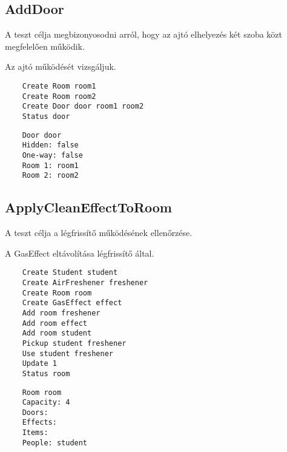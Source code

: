 \subsection{AddDoor}
\begin{test-case-description}
    A teszt célja megbizonyosodni arról, hogy az ajtó elhelyezés két szoba közt megfelelően működik.
\end{test-case-description}
\begin{test-case-function}
    Az ajtó működését vizsgáljuk.
\end{test-case-function}
\begin{test-case-input}
    \begin{verbatim}
    Create Room room1
    Create Room room2
    Create Door door room1 room2
    Status door
    \end{verbatim}
\end{test-case-input}
\begin{test-case-output}
    \begin{verbatim}
    Door door
    Hidden: false
    One-way: false
    Room 1: room1
    Room 2: room2
    \end{verbatim}
\end{test-case-output}

\subsection{ApplyCleanEffectToRoom}
\begin{test-case-description}
    A teszt célja a légfrissítő működésének ellenőrzése.
\end{test-case-description}
\begin{test-case-function}
    A GasEffect eltávolítása légfrissítő által.
\end{test-case-function}
\begin{test-case-input}
    \begin{verbatim}
    Create Student student
    Create AirFreshener freshener
    Create Room room
    Create GasEffect effect
    Add room freshener
    Add room effect
    Add room student
    Pickup student freshener 
    Use student freshener
    Update 1
    Status room
    \end{verbatim}
\end{test-case-input}
\begin{test-case-output}
    \begin{verbatim}
    Room room
    Capacity: 4
    Doors:
    Effects:
    Items:
    People: student 
    \end{verbatim}
\end{test-case-output}

